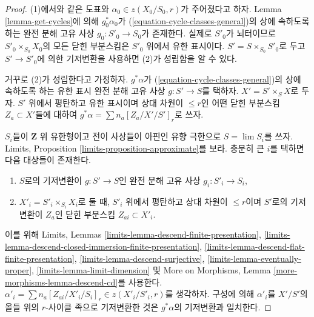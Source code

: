 \begin{proof}
(1)에서와 같은 도표와 $\alpha_0 \in z(X_0/S_0, r)$가 주어졌다고
하자. Lemma \ref{lemma-get-cycles}에 의해
$g_0^*\alpha_0$가 (\ref{equation-cycle-classes-general})의 상에 속하도록
하는 완전 분해 고유 사상 $g_0 : S'_0 \to S_0$가 존재한다. 실제로
$S'_0$가 뇌터이므로 $S'_0 \times_{S_0} X_0$의 모든 닫힌 부분스킴은
$S'_0$ 위에서 유한 표시이다. $S' = S \times_{S_0} S'_0$로 두고
$S' \to S'_0$에 의한 기저변환을 사용하면 (2)가 성립함을 알 수 있다.

\medskip\noindent
거꾸로 (2)가 성립한다고 가정하자. $g^*\alpha$가
(\ref{equation-cycle-classes-general})의 상에 속하도록 하는 유한 표시
완전 분해 고유 사상 $g : S' \to S$를 택하자.
$X' = S' \times_S X$로 두자. $S'$ 위에서 평탄하고 유한 표시이며 상대
차원이 $\leq r$인 어떤 닫힌 부분스킴 $Z_a \subset X'$들에 대하여
$g^*\alpha = \sum n_a [Z_a/X'/S']_r$로 쓰자.

\medskip\noindent
$S_i$들이 $\mathbf{Z}$ 위 유한형이고 전이 사상들이 아핀인 유향
극한으로 $S = \lim S_i$를 쓰자. Limits, Proposition
\ref{limits-proposition-approximate}를 보라. 충분히 큰 $i$를 택하면
다음 대상들이 존재한다.
\begin{enumerate}
\item $S$로의 기저변환이 $g : S' \to S$인 완전 분해 고유 사상
$g_i : S'_i \to S_i$,
\item $X'_i = S'_i \times_{S_i} X_i$로 둘 때, $S'_i$ 위에서 평탄하고
상대 차원이 $\leq r$이며 $S'$로의 기저변환이 $Z_a$인 닫힌 부분스킴
$Z_{ai} \subset X'_i$.
\end{enumerate}
이를 위해 Limits, Lemmas
\ref{limits-lemma-descend-finite-presentation},
\ref{limits-lemma-descend-closed-immersion-finite-presentation},
\ref{limits-lemma-descend-flat-finite-presentation},
\ref{limits-lemma-descend-surjective},
\ref{limits-lemma-eventually-proper},
\ref{limits-lemma-limit-dimension} 및 More on Morphisms, Lemma
\ref{more-morphisms-lemma-descend-cd}를 사용한다.
$\alpha'_i = \sum n_a [Z_{ai}/X'_i/S_i]_r \in z(X'_i/S'_i, r)$를
생각하자. 구성에 의해 $\alpha'_i$를 $X'/S'$의 올들 위의
$r$-사이클 족으로 기저변환한 것은 $g^*\alpha$의 기저변환과 일치한다.


\end{proof}
